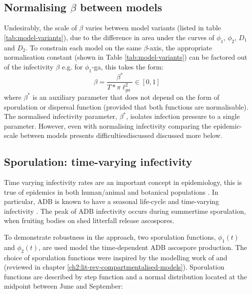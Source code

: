 \subsection{Normalising $\beta$ between models}

Undesirably, the scale of $\beta$ varies between model variants (listed in table \ref{tab:model-variants}), due to the difference in area under the curves of $\phi_1$, $\phi_2$, $D_1$ and $D_2$.
To constrain each model on the same $\beta$-axis, the appropriate normalisation constant (shown in Table \ref{tab:model-variants}) can be factored out of the infectivity $\beta$ 
e.g. for $\phi_1$-ga, this takes the form: 
\begin{equation}
    \beta = \frac{\beta^*}{T * \pi \ell^2_{ga}} \in [0, 1]
\label{eq:normalised-beta}
\end{equation}
where $\beta^*$ is an auxiliary parameter that does not depend on the form of sporulation or dispersal function (provided that both functions are normalisable).
The normalised infectivity parameter, $\beta^*$, isolates infection pressure to a single parameter.
However, even with normalising infectivity comparing the epidemic-scale between models presents difficulties\textemdash discussed discussed more below.

\subsection{Sporulation: time-varying infectivity}
\label{ch6:sporulation}

Time varying infectivity rates are an important concept in epidemiology, this is true of epidemics in both human/animal \cite{svensson2007note, liu2012infectious} 
and botanical populations \cite{suffert2018some, leclerc2014estimating, time-varying-infectivity}.
In particular, ADB is known to have a seasonal life-cycle and time-varying infectivity \cite{grosdidier2018tracking, hietala2013invasive}. 
The peak of ADB infectivity occurs during summertime sporulation, when fruiting bodies on shed litterfall release ascospores.

To demonstrate robustness in the approach, two sporulation functions, $\phi_1(t)$ and $\phi_2(t)$, are used model the time-dependent ADB ascospore production.
The choice of sporulation functions were inspired by the modelling work of \cite{time-varying-infectivity} and \cite{segarra2001epidemic}
(reviewed in chapter \ref{ch2:lit-rev-compartmentalised-models}). 
Sporulation functions are described by step function and a normal distribution located at the midpoint between June and September:

